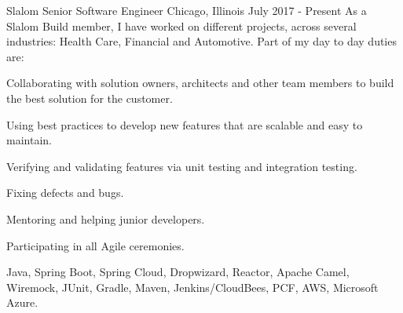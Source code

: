 
\begin{cventries}

  \experienceentry
  {Slalom} %
    {Senior Software Engineer} %
    {Chicago, Illinois} %
    {July 2017 - Present} %
    {As a Slalom Build member, I have worked on different projects, across several industries: Health Care, Financial and Automotive. Part of my day to day duties are:}
    {
    		\begin{cvitems} %
			\item {Collaborating with solution owners, architects and other team members to build the best solution for the customer.}
      		\item {Using best practices to develop new features that are scalable and easy to maintain.}
      		\item {Verifying and validating features via unit testing and integration testing.}
      		\item {Fixing defects and bugs.}
      		\item {Mentoring and helping junior developers.}
        		\item {Participating in all Agile ceremonies.}
      	\end{cvitems}
    }
    {Java, Spring Boot, Spring Cloud, Dropwizard, Reactor, Apache Camel, Wiremock, JUnit, Gradle, Maven, Jenkins/CloudBees, PCF, AWS, Microsoft Azure.}
  

\end{cventries}
